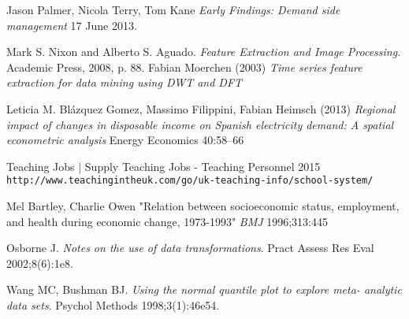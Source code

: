 \documentclass[12pt,a4paper]{report}
\begin{document}
\begin{thebibliography}{9}
Jason Palmer, Nicola Terry, Tom Kane \textit{Early Findings: Demand side management} 17 June 2013.

Mark S. Nixon and Alberto S. Aguado. \textit{Feature Extraction and Image Processing}. Academic Press, 2008, p. 88.
 Fabian Moerchen (2003) \textit{Time series feature extraction for data mining using DWT and DFT}

 Leticia M. Blázquez Gomez, Massimo Filippini, Fabian Heimsch (2013) \textit{Regional impact of changes in disposable income on Spanish electricity demand: A spatial econometric analysis} Energy Economics 40:58–66

 Teaching Jobs | Supply Teaching Jobs - Teaching Personnel 2015 \texttt{http://www.teachingintheuk.com/go/uk-teaching-info/school-system/}

 Mel Bartley, Charlie Owen "Relation between socioeconomic status, employment, and health during economic change, 1973-1993" \textit{BMJ} 1996;313:445

 Osborne J. \textit{Notes on the use of data transformations}. Pract Assess Res Eval 2002;8(6):1e8.

 Wang MC, Bushman BJ. \textit{Using the normal quantile plot to explore meta-
analytic data sets}. Psychol Methods 1998;3(1):46e54.

\end{thebibliography}
\end{document}
